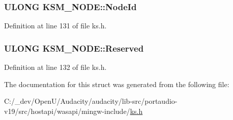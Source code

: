 \subsubsection[{\texorpdfstring{Node\+Id}{NodeId}}]{\setlength{\rightskip}{0pt plus 5cm}U\+L\+O\+NG K\+S\+M\+\_\+\+N\+O\+D\+E\+::\+Node\+Id}\hypertarget{struct_k_s_m___n_o_d_e_ad4075ab07102225a1123b99d483be1ce}{}\label{struct_k_s_m___n_o_d_e_ad4075ab07102225a1123b99d483be1ce}


Definition at line 131 of file ks.\+h.

\subsubsection[{\texorpdfstring{Reserved}{Reserved}}]{\setlength{\rightskip}{0pt plus 5cm}U\+L\+O\+NG K\+S\+M\+\_\+\+N\+O\+D\+E\+::\+Reserved}\hypertarget{struct_k_s_m___n_o_d_e_ae9a6d3699f348593bc319372ca98e79f}{}\label{struct_k_s_m___n_o_d_e_ae9a6d3699f348593bc319372ca98e79f}


Definition at line 132 of file ks.\+h.



The documentation for this struct was generated from the following file\+:\begin{DoxyCompactItemize}
\item 
C\+:/\+\_\+dev/\+Open\+U/\+Audacity/audacity/lib-\/src/portaudio-\/v19/src/hostapi/wasapi/mingw-\/include/\hyperlink{ks_8h}{ks.\+h}\end{DoxyCompactItemize}
